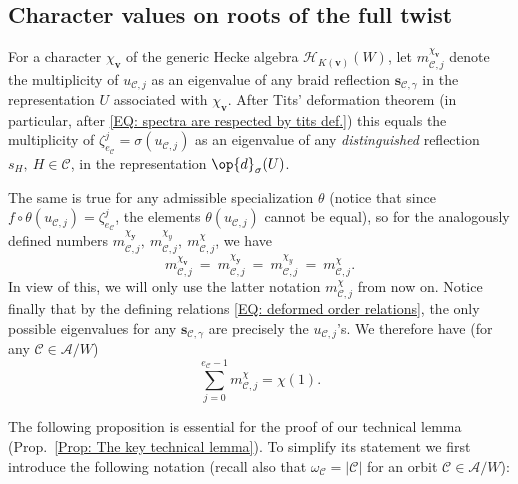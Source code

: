 \subsection{Character values on roots of the full twist}
\label{Section: Character values on roots of the full twist}

For a character $\chi_{\bm v}$ of the generic Hecke algebra $\mathcal{H}_{K(\bm v)}(W)$, let $m^{\chi_{\bm v}}_{\mathcal{C},j}$ denote the multiplicity of $u_{\mathcal{C},j}$ as an eigenvalue of any braid reflection $\bm s_{\mathcal{C},\gamma}$ in the representation $U$ associated with $\chi_{\bm v}$. After Tits' deformation theorem (in particular, after \eqref{EQ: spectra are respected by tits def.}) this equals the multiplicity of $\zeta_{e_{\mathcal{C}}}^j=\sigma (u_{\mathcal{C},j})$ as an eigenvalue of any {\it distinguished} reflection $s_H,\ H\in\mathcal{C}$, in the representation $\op{d}_{\sigma}(U)$. 

The same is true for any admissible specialization $\theta$ (notice that since $f\circ\theta (u_{\mathcal{C},j})=\zeta_{e_{\mathcal{C}}}^j$, the elements $\theta(u_{\mathcal{C},j})$ cannot be equal), so for the analogously defined numbers $m^{\chi_{\bm y}}_{\mathcal{C},j},\ m^{\chi_y}_{\mathcal{C},j},\ m^{\chi}_{\mathcal{C},j}$, we have $$  m^{\chi_{\bm v}}_{\mathcal{C},j}\ =\ m^{\chi_{\bm y}}_{\mathcal{C},j}\ =\ m^{\chi_y}_{\mathcal{C},j}\ =\ m^{\chi}_{\mathcal{C},j}.$$ In view of this, we will only use the latter notation $m^{\chi}_{\mathcal{C},j}$ from now on. Notice finally that by the defining relations \eqref{EQ: deformed order relations}, the only possible eigenvalues for any $\bm s_{\mathcal{C},\gamma}$ are precisely the $u_{\mathcal{C},j}$'s. We therefore have (for any $\mathcal{C}\in\mathcal{A}/W$) \begin{equation} \sum_{j=0}^{e_{\mathcal{C}}-1}m^{\chi}_{\mathcal{C},j}=\chi(1).\label{Eq: sum of m_H,j's=chi(1)}\end{equation} 


The following proposition is essential for the proof of our technical lemma (Prop.~\ref{Prop: The key technical lemma}). To simplify its statement we first introduce the following notation (recall also that $\omega_{\mathcal{C}}=|\mathcal{C}|$ for an orbit $\mathcal{C}\in\mathcal{A}/W$):

